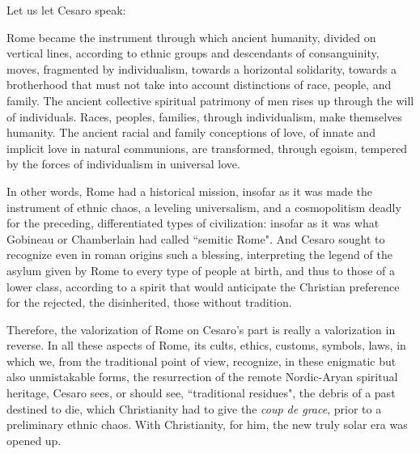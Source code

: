 Let us let Cesaro speak:

\begin{quotex}
Rome became the instrument through which ancient humanity, divided on vertical lines, according to ethnic groups and descendants of consanguinity, moves, fragmented by individualism, towards a horizontal solidarity, towards a brotherhood that must not take into account distinctions of race, people, and family. The ancient collective spiritual patrimony of men rises up through the will of individuals. Races, peoples, families, through individualism, make themselves humanity. The ancient racial and family conceptions of love, of innate and implicit love in natural communions, are transformed, through egoism, tempered by the forces of individualism in universal love. 

\end{quotex}
In other words, Rome had a historical mission, insofar as it was made the instrument of ethnic chaos, a leveling universalism, and a cosmopolitism deadly for the preceding, differentiated types of civilization: insofar as it was what Gobineau or Chamberlain had called ``semitic Rome". And Cesaro sought to recognize even in roman origins such a blessing, interpreting the legend of the asylum given by Rome to every type of people at birth, and thus to those of a lower class, according to a spirit that would anticipate the Christian preference for the rejected, the disinherited, those without tradition.

Therefore, the valorization of Rome on Cesaro's part is really a valorization in reverse. In all these aspects of Rome, its cults, ethics, customs, symbols, laws, in which we, from the traditional point of view, recognize, in these enigmatic but also unmistakable forms, the resurrection of the remote Nordic-Aryan spiritual heritage, Cesaro sees, or should see, ``traditional residues", the debris of a past destined to die, which Christianity had to give the \emph{coup de grace}, prior to a preliminary ethnic chaos. With Christianity, for him, the new truly solar era was opened up.

